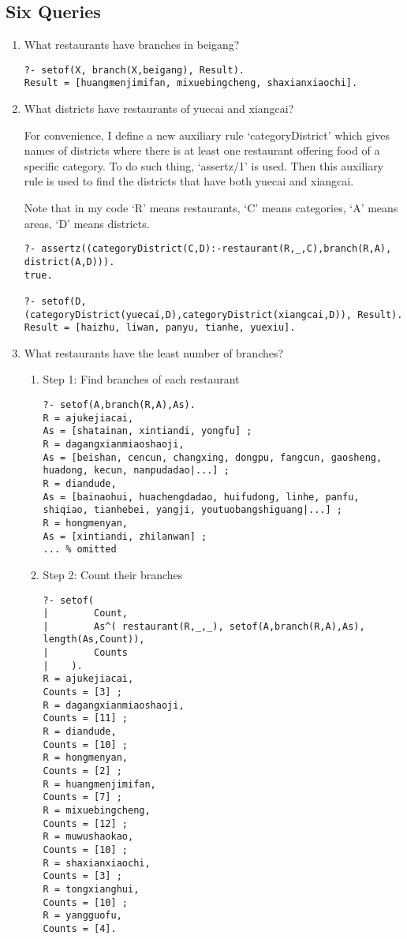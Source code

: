 ﻿\documentclass[a4paper, 11pt]{article}
\begin{document}
\subsection{Six Queries}

\begin{enumerate}
\item What restaurants have branches in beigang? 
\begin{lstlisting}
?- setof(X, branch(X,beigang), Result).
Result = [huangmenjimifan, mixuebingcheng, shaxianxiaochi].
\end{lstlisting}


\item What districts have restaurants of yuecai and xiangcai?

For convenience, I define a new auxiliary rule `categoryDistrict' which gives names of districts where there is at least one restaurant offering food of a specific category. To do such thing, `assertz/1' is used. Then this auxiliary rule is used to find the districts that have both yuecai and xiangcai.

Note that in my code `R' means restaurants, `C' means categories, `A' means areas, `D' means districts.
\begin{lstlisting}
?- assertz((categoryDistrict(C,D):-restaurant(R,_,C),branch(R,A), district(A,D))).
true.

?- setof(D, (categoryDistrict(yuecai,D),categoryDistrict(xiangcai,D)), Result).
Result = [haizhu, liwan, panyu, tianhe, yuexiu].
\end{lstlisting}


\item What restaurants have the least number of branches?
\begin{enumerate}
    \item Step 1: Find branches of each restaurant
    \begin{lstlisting}
?- setof(A,branch(R,A),As).
R = ajukejiacai,
As = [shatainan, xintiandi, yongfu] ;
R = dagangxianmiaoshaoji,
As = [beishan, cencun, changxing, dongpu, fangcun, gaosheng, huadong, kecun, nanpudadao|...] ;
R = diandude,
As = [bainaohui, huachengdadao, huifudong, linhe, panfu, shiqiao, tianhebei, yangji, youtuobangshiguang|...] ;
R = hongmenyan,
As = [xintiandi, zhilanwan] ;
... % omitted
    \end{lstlisting}
    
    \item Step 2: Count their branches
    \begin{lstlisting}
?- setof(
|        Count,
|        As^( restaurant(R,_,_), setof(A,branch(R,A),As), length(As,Count)),
|        Counts
|    ).
R = ajukejiacai,
Counts = [3] ;
R = dagangxianmiaoshaoji,
Counts = [11] ;
R = diandude,
Counts = [10] ;
R = hongmenyan,
Counts = [2] ;
R = huangmenjimifan,
Counts = [7] ;
R = mixuebingcheng,
Counts = [12] ;
R = muwushaokao,
Counts = [10] ;
R = shaxianxiaochi,
Counts = [3] ;
R = tongxianghui,
Counts = [10] ;
R = yangguofu,
Counts = [4].
    \end{lstlisting}
    

\end{enumerate}
\end{enumerate}
\end{document}
